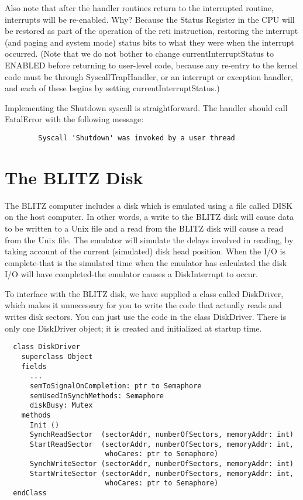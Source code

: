 \documentclass[12pt]{article}
\begin{document}
Also note that after the handler routines return to the interrupted
routine, interrupts will be re-enabled.  Why?  Because the Status
Register in the CPU will be restored as part of the operation of the
reti instruction, restoring the interrupt (and paging and system mode)
status bits to what they were when the interrupt occurred.  (Note that
we do not bother to change currentInterruptStatus to ENABLED before
returning to user-level code, because any re-entry to the kernel code
must be through SyscallTrapHandler, or an interrupt or exception
handler, and each of these begins by setting currentInterruptStatus.)

Implementing the Shutdown syscall is straightforward.  The handler
should call FatalError with the following message:

\begin{verbatim}
        Syscall 'Shutdown' was invoked by a user thread
\end{verbatim}

\section{The BLITZ Disk}

The BLITZ computer includes a disk which is emulated using a file
called DISK on the host computer.  In other words, a write to the
BLITZ disk will cause data to be written to a Unix file and a read
from the BLITZ disk will cause a read from the Unix file.  The
emulator will simulate the delays involved in reading, by taking
account of the current (simulated) disk head position.  When the I/O
is complete-that is the simulated time when the emulator has
calculated the disk I/O will have completed-the emulator causes a
DiskInterrupt to occur.

To interface with the BLITZ disk, we have supplied a class called
DiskDriver, which makes it unnecessary for you to write the code that
actually reads and writes disk sectors.  You can just use the code in
the class DiskDriver.  There is only one DiskDriver object; it is
created and initialized at startup time.

\begin{verbatim}
  class DiskDriver
    superclass Object
    fields
      ...
      semToSignalOnCompletion: ptr to Semaphore
      semUsedInSynchMethods: Semaphore
      diskBusy: Mutex
    methods
      Init ()
      SynchReadSector  (sectorAddr, numberOfSectors, memoryAddr: int)
      StartReadSector  (sectorAddr, numberOfSectors, memoryAddr: int,
                        whoCares: ptr to Semaphore)
      SynchWriteSector (sectorAddr, numberOfSectors, memoryAddr: int)
      StartWriteSector (sectorAddr, numberOfSectors, memoryAddr: int,
                        whoCares: ptr to Semaphore)
  endClass
\end{verbatim}
\end{document}
